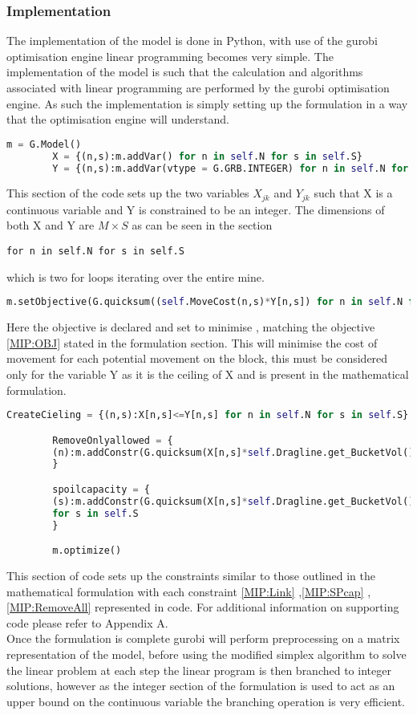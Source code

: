 \subsubsection{Implementation}
The implementation of the model is done in Python, with use of the gurobi optimisation engine linear programming becomes very simple. The implementation of the model is such that the calculation and algorithms associated with linear programming are performed by the gurobi optimisation engine. As such the implementation is simply setting up the formulation in a way that the optimisation engine will understand.
\begin{lstlisting}[language=Python]
		m = G.Model() 
		X = {(n,s):m.addVar() for n in self.N for s in self.S}
		Y = {(n,s):m.addVar(vtype = G.GRB.INTEGER) for n in self.N for s in self.S}
		\end{lstlisting}
		This section of the code sets up the two variables $X_{jk}$ and $Y_{jk}$ such that X is a continuous variable and Y is constrained to be an integer. The dimensions of both X and Y are $M \times S$ as can be seen in the section \begin{lstlisting}for n in self.N for s in self.S\end{lstlisting} which is two for loops iterating over the entire mine. 
		\begin{lstlisting}[language=Python]
		m.setObjective(G.quicksum((self.MoveCost(n,s)*Y[n,s]) for n in self.N for s in self.S),G.GRB.MINIMIZE)
		\end{lstlisting}
Here the objective is declared and set to minimise , matching the objective \ref{MIP:OBJ} stated in the formulation section. This will minimise the cost of movement for each potential movement on the block, this must be considered only for the variable Y as it is the ceiling of X and is present in the mathematical formulation.	\begin{lstlisting}[language=Python]
		CreateCieling = {(n,s):X[n,s]<=Y[n,s] for n in self.N for s in self.S}

		RemoveOnlyallowed = {
		(n):m.addConstr(G.quicksum(X[n,s]*self.Dragline.get_BucketVol() for s in self.S)==self.Mine[n]) for n in self.N
		}

		spoilcapacity = {
		(s):m.addConstr(G.quicksum(X[n,s]*self.Dragline.get_BucketVol()*self.swell*self.expand for n in self.N)+self.Spoil[s]<=self.spoilcap)
		for s in self.S
		}

		m.optimize()
\end{lstlisting}
This section of code sets up the constraints similar to those outlined in the mathematical formulation with each constraint \ref{MIP:Link} ,\ref{MIP:SPcap} ,\ref{MIP:RemoveAll}  represented in code. For additional information on supporting code please refer to Appendix A. \\  Once the formulation is complete gurobi will perform preprocessing on a matrix representation of the model, before using the modified simplex algorithm to solve the linear problem\cite{gurobi} at each step the linear program is then branched to integer solutions, however as the integer section of the formulation is used to act as an upper bound on the continuous variable the branching operation is very efficient. 
